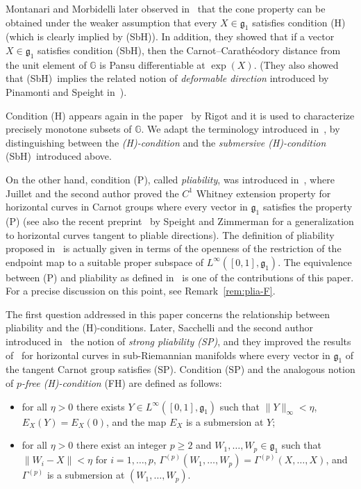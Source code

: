\documentclass[pdftex]{sigma}
\numberwithin{equation}{section}
\theoremstyle{definition}
\begin{document}
Montanari and Morbidelli later observed
in~\cite{MontanariMorbidelli2021} that the cone property can be obtained
under the weaker assumption
that every $X\in {\mathfrak g}_1$ satisfies condition (H) (which is clearly implied by (SbH)). In addition, they showed that if a vector $X\in {\mathfrak g}_1$ satisfies condition (SbH), then the
Carnot--Carath\'eodory distance from the unit element of $\mathbb{G}$ is Pansu differentiable at $\exp(X)$.
(They also showed that (SbH)\ implies the related
notion of \emph{deformable direction} introduced by Pinamonti and Speight in~\cite{PinamontiSpeight}).

Condition (H) appears again in the paper~\cite{Rigot} by Rigot and it is used to characterize precisely monotone subsets of $\mathbb{G}$. We adapt the terminology introduced in~\cite{Rigot}, by distinguishing between the {\em {\rm (H)}-condition} and the {\em submersive {\rm (H)}-condition} (SbH)\ introduced above.

On the other hand, condition (P), called \emph{pliability}, was introduced
 in~\cite{Juillet-Sigalotti}, where Juillet and the second author proved the $C^1$ Whitney extension property for horizontal curves in Carnot groups where every vector in ${\mathfrak g}_1$ satisfies the property (P) (see also the recent preprint~\cite{SpeightZimmerman} by Speight and Zimmerman for a generalization to horizontal curves tangent to pliable directions).
The definition of pliability proposed in~\cite{Juillet-Sigalotti} is actually given in terms of the openness of the restriction of the endpoint map to a suitable proper subspace of $L^\infty([0,1],\mathfrak{g}_1)$. The equivalence between (P) and pliability as defined in~\cite{Juillet-Sigalotti} is one of the contributions of this paper. For a precise discussion on this point, see Remark~\ref{rem:plia-F}.

The first question addressed in this paper concerns the relationship
between pliability and the (H)-conditions.
Later, Sacchelli and the second author introduced in~\cite{SS18} the notion of {\em strong pliability {\rm (SP)}}, and they improved the results of~\cite{Juillet-Sigalotti} for horizontal curves in sub-Riemannian manifolds where every vector in ${\mathfrak g}_1$ of the tangent Carnot group satisfies (SP). Condition (SP) and the analogous notion of \emph{$p$-free {\rm (H)}-condition} (FH) are defined as follows:
\begin{itemize}\itemsep=0pt\setlength{\leftskip}{0.05cm}
 \item[(SP)] for all $\eta>0$ there exists $Y\in L^\infty([0,1],{\mathfrak g}_1)$ such that $\|Y\|_\infty<\eta$, $E_X(Y)=E_X(0)$, and the map $E_X$ is a submersion at $Y$;
 \item[(FH)] for all $\eta>0$ there exist an integer $p\ge 2$ and $W_1,\dots,W_p\in {\mathfrak g}_1$ such that $\|W_i-X\|<\eta$ for $i=1,\dots,p$, $\Gamma^{(p)} (W_1,\dots,W_p) = \Gamma^{(p)} (X, \dots, X)$, and $\Gamma^{(p)}$ is a submersion at $(W_1,\dots,W_p)$.
\end{itemize}
\end{document}
